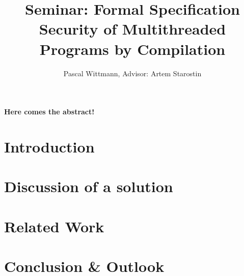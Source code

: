 \documentclass[a4paper,10pt]{llncs}
\begin{document}
\title{{\normalsize Seminar: Formal Specification} \\[1ex]
  Security of Multithreaded Programs by Compilation}
\author{Pascal Wittmann, Advisor: Artem Starostin}
\institute{}

\maketitle



{\bf Here comes the abstract!}

\section{Introduction}
\section{Discussion of a solution}
\section{Related Work}
\section{Conclusion \& Outlook}


\end{document}
